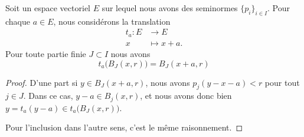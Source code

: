 \begin{lemma}
	Soit un espace vectoriel \( E\) sur lequel nous avons des seminormes \( \{ p_i \}_{i\in I}\). Pour chaque \( a\in E\), nous considérons la translation
	\begin{equation}
		\begin{aligned}
			t_a\colon E & \to E        \\
			x           & \mapsto x+a.
		\end{aligned}
	\end{equation}
	Pour toute partie finie \( J\subset I\) nous avons
	\begin{equation}
		t_a\big( B_J(x,r) \big)=B_J(x+a,r)
	\end{equation}
\end{lemma}

\begin{proof}
	D'une part si \( y\in B_J(x+a,r)\), nous avons \( p_j(y-x-a)<r\) pour tout \( j\in J\). Dans ce cas, \( y-a\in B_j(x,r)\), et nous avons donc bien \( y=t_a(y-a)\in t_a\big( B_J(x,r) \big)\).

	Pour l'inclusion dans l'autre sens, c'est le même raisonnement.
\end{proof}

